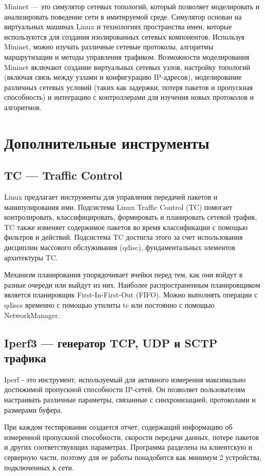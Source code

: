 Mininet --- это симулятор сетевых топологий, который позволяет моделировать и
анализировать поведение сети в имитируемой среде. Симулятор основан на
виртуальных машинах Linux и технологиях пространства имен, которые используются
для создания изолированных сетевых компонентов. Используя Mininet, можно
изучать различные сетевые протоколы, алгоритмы маршрутизации и методы
управления трафиком. Возможности моделирования Mininet включают создание
виртуальных сетевых узлов, настройку топологий (включая связь между узлами и
конфигурацию IP-адресов), моделирование различных сетевых условий (таких как
задержки, потеря пакетов и пропускная способность) и интеграцию с контроллерами
для изучения новых протоколов и алгоритмов.

\section{Дополнительные инструменты} %
\label{chap1:sec4}

\subsection{TC --- Traffic Control}
\label{chap1:sec4:sub1}

Linux предлагает инструменты для управления передачей пакетов и манипулирования
ими. Подсистема Linux Traffic Control (TC) помогает контролировать,
классифицировать, формировать и планировать сетевой трафик. TC также изменяет
содержимое пакетов во время классификации с помощью фильтров и действий.
Подсистема TC достигла этого за счет использования дисциплин массового
обслуживания (qdisc), фундаментальных элементов архитектуры TC. 

Механизм планирования упорядочивает ячейки перед тем, как они войдут в разные
очереди или выйдут из них. Наиболее распространенным планировщиком является
планировщик First-In-First-Out (FIFO). Можно выполнять операции с qdiscs
временно с помощью утилиты tc или постоянно с помощью NetworkManager.

\subsection{Iperf3 --- генератор TCP, UDP и SCTP трафика}
\label{chap1:sec4:sub2}

Iperf - это инструмент, используемый для активного измерения максимально
достижимой пропускной способности IP-сетей. Он позволяет пользователям
настраивать различные параметры, связанные с синхронизацией, протоколами и
размерами буфера. 

При каждом тестировании создается отчет, содержащий информацию об измеренной
пропускной способности, скорости передачи данных, потере пакетов и других
соответствующих параметрах. Программа разделена на клиентскую и серверную
части, поэтому для ее работы понадобится как минимум 2 устройства,
подключенных к сети. 


